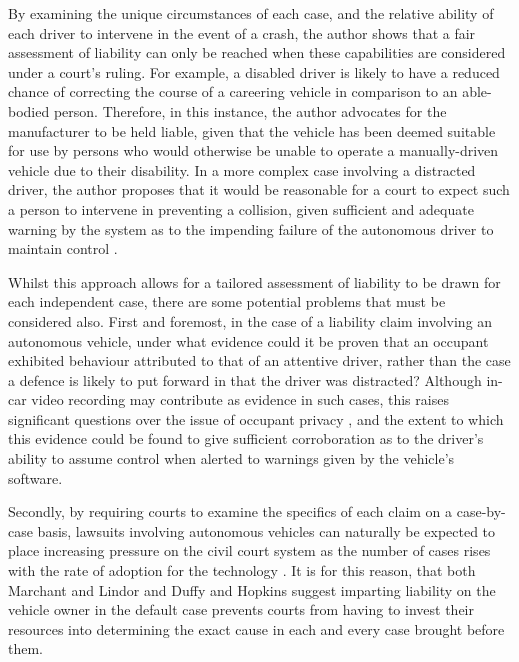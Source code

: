 \documentclass[conference]{IEEEtran}
\begin{document}
 By examining the unique circumstances of each case, and the relative ability of each driver to intervene in the event of a crash, the author shows that a fair assessment of liability can only be reached when these capabilities are considered under a court's ruling. For example, a disabled driver is likely to have a reduced chance of correcting the course of a careering vehicle in comparison to an able-bodied person. Therefore, in this instance, the author advocates for the manufacturer to be held liable, given that the vehicle has been deemed suitable for use by persons who would otherwise be unable to operate a manually-driven vehicle due to their disability. In a more complex case involving a distracted driver, the author proposes that it would be reasonable for a court to expect such a person to intervene in preventing a collision, given sufficient and adequate warning by the system as to the impending failure of the autonomous driver to maintain control \cite{gurney}. 

Whilst this approach allows for a tailored assessment of liability to be drawn for each independent case, there are some potential problems that must be considered also. First and foremost, in the case of a liability claim involving an autonomous vehicle, under what evidence could it be proven that an occupant  exhibited behaviour attributed to that of an attentive driver, rather than the case a defence is likely to put forward in that the driver was distracted? Although in-car video recording may contribute as evidence in such cases, this raises significant questions over the issue of occupant privacy \cite{marshall}, and the extent to which this evidence could be found to give sufficient corroboration as to the driver's ability to assume control when alerted to warnings given by the vehicle's software.

Secondly, by requiring courts to examine the specifics of each claim on a case-by-case basis, lawsuits involving autonomous vehicles can naturally be expected to place increasing pressure on the civil court system as the number of cases rises with the rate of adoption for the technology \cite{marchant}. It is for this reason, that both Marchant and Lindor \cite{marchant} and Duffy and Hopkins \cite{duffy} suggest imparting liability on the vehicle owner in the default case prevents courts from having to invest their resources into determining the exact cause in each and every case brought before them.
\end{document}

